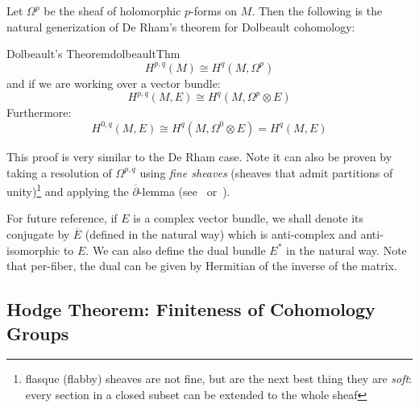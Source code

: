 \documentclass{ut-thesis}
\newenvironment{Proof}[1][]
  {\begin{ProofTcb}[#1]}
  {\end{ProofTcb}}
\begin{document}
Let $\Omega^p$ be the sheaf of holomorphic $p$-forms on $M$. Then the following is the natural
generization of De Rham's theorem for Dolbeault cohomology:
\begin{thm}{Dolbeault's Theorem}{dolbeaultThm}
  \[
  H^{p,q}(M) \cong H^q(M, \Omega^p)
\]
and if we are working over a vector bundle:
\[
  H^{p,q}(M, E) \cong H^q(M, \Omega^p\otimes E)
\]
Furthermore:
\[
  H^{0,q}(M, E) \cong H^q(M, \Omega^0\otimes E) = H^q(M, E)
\]
\end{thm}

\begin{Proof}
  This proof is very similar to the De Rham case. Note it can also be proven by taking a resolution of
  $\Omega^{p,q}$ using \emph{fine sheaves} (sheaves that admit partitions of unity)\footnote{flasque (flabby) sheaves are
  not fine, but are the next best thing they are \emph{soft}: every section in a closed subset can be extended
  to the whole sheaf} and applying the $\overline{\partial}$-lemma
  (see~\cite{gallierComplexAlgebraicGeometry2011} or~\cite[section~15.4]{hirzebruchTopologicalMethodsAlgebraic1995}).
\end{Proof}

For future reference, if $E$ is a complex vector bundle, we shall denote its conjugate by $\overline{E}$
(defined in the natural way) which is anti-complex and anti-isomorphic to $E$. We can also define the dual
bundle $E^*$ in the natural way. Note that per-fiber, the dual can be given by Hermitian of the inverse of the
matrix.

\subsection*{Hodge Theorem: Finiteness of Cohomology Groups}
\end{document}
